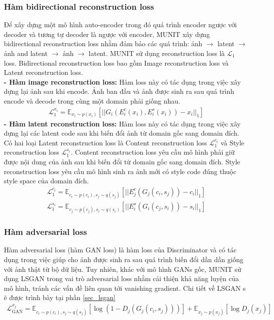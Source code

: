 {    \subsubsection{Hàm bidirectional reconstruction loss}
    Để xây dựng một mô hình auto-encoder trong đó quá trình encoder ngược với decoder và tương tự decoder là ngược với encoder, MUNIT xây dựng bidirectional reconstruction loss nhằm đảm bảo các quá trình: ảnh $\rightarrow$ latent $\rightarrow$ ảnh and latent $\rightarrow$ ảnh $\rightarrow$ latent. MUNIT sử dụng reconstruction loss là $\mathcal{L}_{1}$ loss. Bidirectional reconstruction loss bao gồm Image reconstruction loss và Latent reconstruction loss.\\
    \textbf{- Hàm image reconstruction loss:} Hàm loss này có tác dụng trong việc xây dựng lại ảnh sau khi encode. Ảnh ban đầu và ảnh được sinh ra sau quá trình encode và decode trong cùng một domain phải giống nhau.
    \begin{align}
    \mathcal{L}^{x_{i}}_{1} = \mathbb{E}_{x_{i} \sim p(x_{i})}[||G_{i}(E_{i}^{c}(x_{i}), E_{i}^{s}(x_{i}))-x_{i}||_{1}]
    \end{align}
    \textbf{- Hàm latent reconstruction loss:} Hàm loss này có tác dụng trong việc xây dựng lại các latent code sau khi biến đổi ảnh từ domain gốc sang domain đích. Có hai loại Latent reconstruction loss là Content reconstruction loss $\mathcal{L}^{c_{i}}_{1}$ và Style reconstruction loss $\mathcal{L}^{s_{i}}_{1}$. Content reconstruction loss yêu cầu mô hình phải giữ được nội dung của ảnh sau khi biến đổi từ domain gốc sang domain đích. Style reconstruction loss yêu cầu mô hình sinh ra ảnh mới có style code đúng thuộc style space của domain đích.
    \begin{align}
    \mathcal{L}^{c_{i}}_{1} = \mathbb{E}_{c_{i}\sim p(c_{i}), s_{j}\sim q(s_{j})}[||E^{c}_{j}(G_{j}(c_{i},s_{j}))-c_{i}||_{1}]
    \end{align}
    \begin{align}
    \mathcal{L}^{s_{i}}_{1} = \mathbb{E}_{c_{j}\sim p(c_{j}), s_{i}\sim q(s_{i})}[||E^{s}_{i}(G_{i}(c_{j},s_{i}))-s_{i}||_{1}]
    \end{align}
    
    \subsubsection{Hàm adversarial loss}
    Hàm adversarial loss (hàm GAN loss) là hàm loss của Discriminator và có tác dụng trong việc giúp cho ảnh được sinh ra sau quá trình biến đổi dần dần giống với ảnh thật từ bộ dữ liệu. Tuy nhiên, khác với mô hình GANs gốc, MUNIT sử dụng LSGAN \cite{lsgan} trong vai trò adversarial loss nhằm cải thiện khả năng luyện của mô hình, tránh các vấn đề liên quan tới vanishing gradient. Chi tiết về LSGAN s
   ẽ được trình bày tại phần \ref{sec_lsgan}
    \begin{align}
    \mathcal{L}^{x_{j}}_{\text{GAN}} = \mathbb{E}_{c_{i} \sim p(c_{i}), s_{j} \sim q(s_{j})} [\log(1 - D_{j}(G_{j}(c_{i}, s_{j})))] + \mathbb{E}_{x_{j} \sim p(x_{j})} [\log D_{j}(x_{j})]
    \end{align}
    
}
